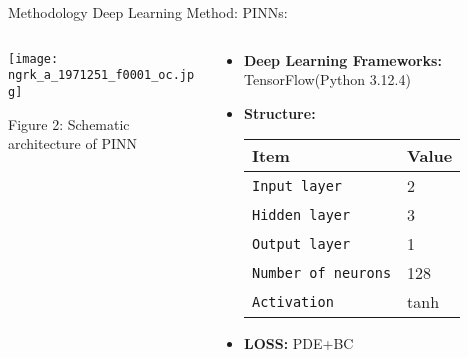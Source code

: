 \documentclass{beamer}
\begin{document}
\begin{frame}{Methodology}
Deep Learning Method: PINNs: 
\begin{columns}
        \begin{column}{0.5\textwidth}
            \centering
            \texttt{[image: ngrk\_a\_1971251\_f0001\_oc.jpg]} %
            \caption{\footnotesize Figure 2: Schematic architecture of PINN}
        \end{column}

        \begin{column}{0.5\textwidth}
            \begin{itemize}
                \item \textbf{Deep Learning Frameworks:} TensorFlow(Python 3.12.4)
                \item \textbf{Structure:}
                \begin{table}[!htbp]
                    \centering
                    \begin{tabular}{l  | l}
                        \hline
                        \small Item & \small Value \\
                        \hline
                        \texttt{\small Input layer}  & \small 2 \\
                        \texttt{\small Hidden layer} & \small 3  \\
                        \texttt{\small Output layer}  & \small 1 \\
                        \texttt{\small Number of neurons}& \small 128  \\
                        \texttt{\small Activation}& \small tanh \\
                        \hline
                    \end{tabular}
                    \label{doc}
                \end{table}
                \item \textbf{LOSS:} PDE+BC
                
            \end{itemize}
        \end{column}
    \end{columns}
\end{frame}


\end{document}
